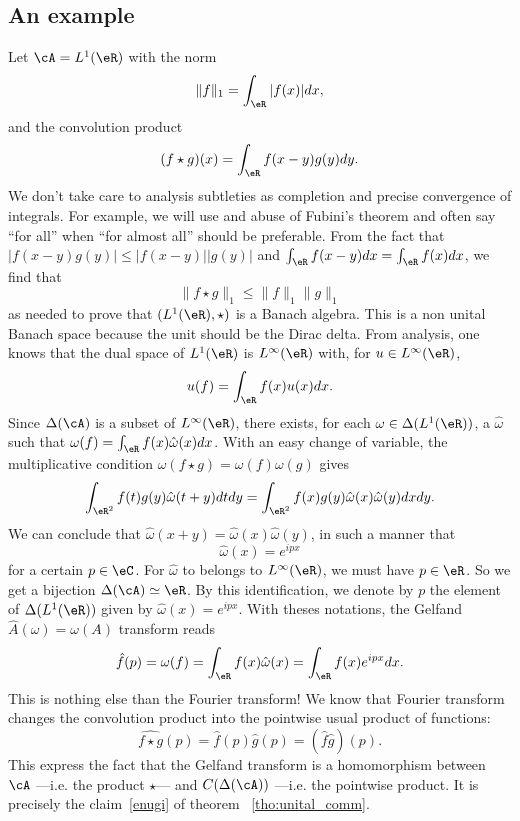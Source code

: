 \subsection{An example}

Let $\cA=L^1(\eR)$ with the norm
\[
	\|f\|_1=\int_{\eR}|f(x)|dx,
\]
and the convolution product
\[
	(f\star g)(x)=\int_{\eR}f(x-y)g(y)dy.
\]
We don't take care to analysis subtleties as completion and precise convergence of integrals. For example, we will use and abuse of Fubini's theorem and often say ``for all'' when ``for almost all'' should be preferable. From the fact that $|f(x-y)g(y)|\leq|f(x-y)||g(y)|$ and $\int_{\eR}f(x-y)dx=\int_{\eR}f(x)dx$, we find that
\[
	\|f\star g\|_1\leq \|f\|_1\|g\|_1
\]
as needed to prove that $(L^1(\eR),\star)$ is a Banach algebra. This is a non unital Banach space because the unit should be the Dirac delta. From analysis, one knows that the dual space of $L^1(\eR)$ is $L^{\infty}(\eR)$ with, for $u\in L^{\infty}(\eR)$,
\[
	u(f)=\int_{\eR}f(x)u(x)dx.
\]
Since $\Delta(\cA)$ is a subset of $L^{\infty}(\eR)$, there exists, for each $\omega\in\Delta(L^1(\eR))$, a $\hat{\omega}$ such that $\omega(f)=\int_{\eR}f(x)\hat{\omega}(x)dx$. With an easy change of variable, the multiplicative condition $\omega(f\star g)=\omega(f)\omega(g)$ gives
\[
	\int_{\eR^2}f(t)g(y)\hat{\omega}(t+y)dtdy=\int_{\eR^2}f(x)g(y)\hat{\omega}(x)\hat{\omega}(y)dxdy.
\]
We can conclude that $\hat{\omega}(x+y)=\hat{\omega}(x)\hat{\omega}(y)$, in such a manner that
\[
	\hat{\omega}(x)=e^{ipx}
\]
for a certain $p\in\eC$. For $\hat{\omega}$ to belongs to $L^{\infty}(\eR)$, we must have $p\in\eR$. So we get a bijection $\Delta(\cA)\simeq\eR$. By this identification, we denote by $p$ the element of $\Delta(L^1(\eR))$ given by $\hat{\omega}(x)=e^{ipx}$. With theses notations, the Gelfand $\hat A(\omega)=\omega(A)$ transform reads
\begin{equation}
	\hat f(p)=\omega(f)=\int_{\eR}f(x)\hat{\omega}(x)
	=\int_{\eR}f(x)e^{ipx}dx.
\end{equation}
This is nothing else than the Fourier transform! We know that Fourier transform changes the convolution product into the pointwise usual product of functions:
\[
	\widehat{f\star g}(p)=\hat f(p)\hat g(p)=(\hat f\hat g)(p).
\]
This express the fact that the Gelfand transform is a homomorphism between $\cA$ ---i.e. the product $\star$--- and $C(\Delta(\cA))$ ---i.e. the pointwise product. It is precisely the claim~\ref{enugi} of theorem ~\ref{tho:unital_comm}.


